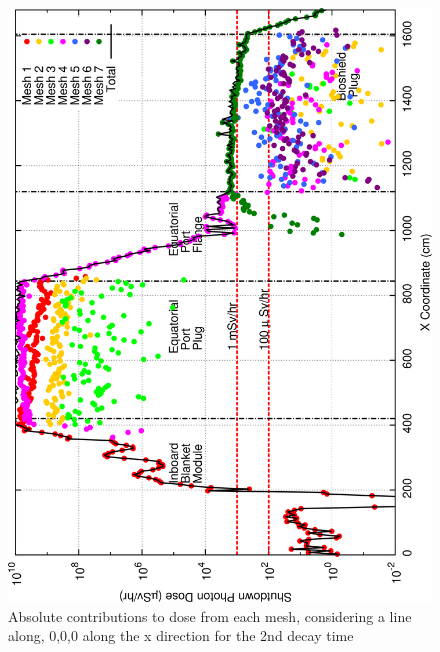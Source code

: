 \documentclass[12pt]{article}
\begin{document}
\begin{figure}[ht!]
\centering
\includegraphics[clip,scale=0.25]{../plots/crosstalk/b4c/ep/dc2.png}
\caption{Absolute contributions to dose from each mesh, considering a line along, 0,0,0 along the x direction for the 2nd decay time}
\label{fig:b4c_ct_ep_dc2}
\end{figure}
\end{document}
